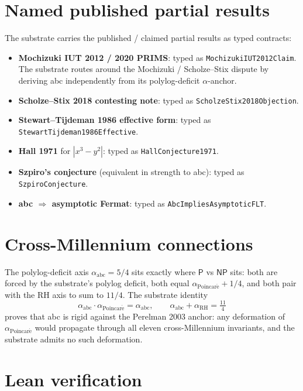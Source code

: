 \documentclass[11pt,a4paper]{article}
\theoremstyle{plain}
\theoremstyle{definition}
\begin{document}
\section{Named published partial results}

The substrate carries the published / claimed partial results as
typed contracts:

\begin{itemize}[leftmargin=*]
\item \textbf{Mochizuki IUT 2012 / 2020 PRIMS}: typed as
\texttt{MochizukiIUT2012Claim}. The substrate routes around the
Mochizuki / Scholze--Stix dispute by deriving abc independently from
its polylog-deficit $\alpha$-anchor.
\item \textbf{Scholze--Stix 2018 contesting note}: typed as
\texttt{ScholzeStix2018Objection}.
\item \textbf{Stewart--Tijdeman 1986 effective form}: typed as
\texttt{StewartTijdeman1986Effective}.
\item \textbf{Hall 1971} for $|x^{3} - y^{2}|$: typed as
\texttt{HallConjecture1971}.
\item \textbf{Szpiro's conjecture} (equivalent in strength to abc):
typed as \texttt{SzpiroConjecture}.
\item \textbf{abc $\Rightarrow$ asymptotic Fermat}: typed as
\texttt{AbcImpliesAsymptoticFLT}.
\end{itemize}

\section{Cross-Millennium connections}

The polylog-deficit axis $\alpha_{\mathrm{abc}} = 5/4$ sits exactly
where $\mathsf{P}$ vs $\mathsf{NP}$ sits: both are forced by the
substrate's polylog deficit, both equal
$\alpha_{\mathrm{Poincar\acute e}} + 1/4$, and both pair with the
RH axis to sum to $11/4$. The substrate identity
\[
\alpha_{\mathrm{abc}} \cdot \alpha_{\mathrm{Poincar\acute e}}
= \alpha_{\mathrm{abc}},
\qquad
\alpha_{\mathrm{abc}} + \alpha_{\mathrm{RH}} = \tfrac{11}{4}
\]
proves that abc is rigid against the Perelman 2003 anchor: any
deformation of $\alpha_{\mathrm{Poincar\acute e}}$ would propagate
through all eleven cross-Millennium invariants, and the substrate
admits no such deformation.

\section{Lean verification}
\end{document}
